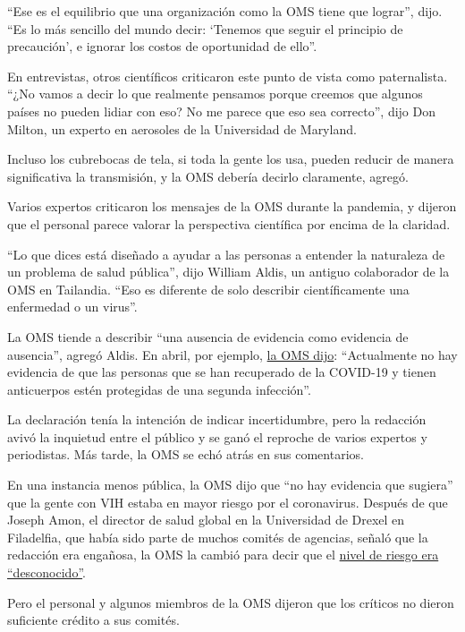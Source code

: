 ``Ese es el equilibrio que una organización como la OMS tiene que
lograr'', dijo. ``Es lo más sencillo del mundo decir: `Tenemos que
seguir el principio de precaución', e ignorar los costos de oportunidad
de ello''.

En entrevistas, otros científicos criticaron este punto de vista como
paternalista. ``¿No vamos a decir lo que realmente pensamos porque
creemos que algunos países no pueden lidiar con eso? No me parece que
eso sea correcto'', dijo Don Milton, un experto en aerosoles de la
Universidad de Maryland.

Incluso los cubrebocas de tela, si toda la gente los usa, pueden reducir
de manera significativa la transmisión, y la OMS debería decirlo
claramente, agregó.

Varios expertos criticaron los mensajes de la OMS durante la pandemia, y
dijeron que el personal parece valorar la perspectiva científica por
encima de la claridad.

``Lo que dices está diseñado a ayudar a las personas a entender la
naturaleza de un problema de salud pública'', dijo William Aldis, un
antiguo colaborador de la OMS en Tailandia. ``Eso es diferente de solo
describir científicamente una enfermedad o un virus''.

La OMS tiende a describir ``una ausencia de evidencia como evidencia de
ausencia'', agregó Aldis. En abril, por ejemplo,
\href{https://www.reuters.com/article/us-health-coronavirus-who-idUSKCN2270FB}{la
OMS dijo}: ``Actualmente no hay evidencia de que las personas que se han
recuperado de la COVID-19 y tienen anticuerpos estén protegidas de una
segunda infección''.

La declaración tenía la intención de indicar incertidumbre, pero la
redacción avivó la inquietud entre el público y se ganó el reproche de
varios expertos y periodistas. Más tarde, la OMS se echó atrás en sus
comentarios.

En una instancia menos pública, la OMS dijo que ``no hay evidencia que
sugiera'' que la gente con VIH estaba en mayor riesgo por el
coronavirus. Después de que Joseph Amon, el director de salud global en
la Universidad de Drexel en Filadelfia, que había sido parte de muchos
comités de agencias, señaló que la redacción era engañosa, la OMS la
cambió para decir que el
\href{https://www.who.int/emergencies/diseases/novel-coronavirus-2019/question-and-answers-hub/q-a-detail/q-a-on-covid-19-hiv-and-antiretrovirals}{nivel
de riesgo era ``desconocido''}.

Pero el personal y algunos miembros de la OMS dijeron que los críticos
no dieron suficiente crédito a sus comités.

